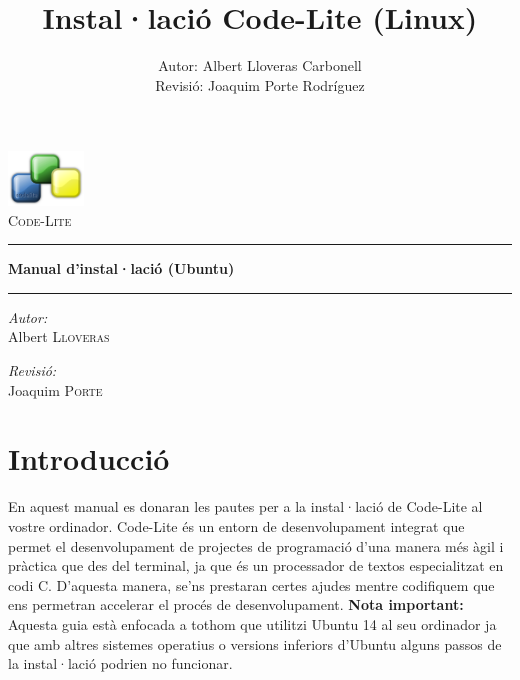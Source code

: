 \documentclass[11pt]{article}
\title{Instal·lació Code-Lite (Linux)}
\author{Autor: Albert Lloveras Carbonell\\Revisió: Joaquim Porte Rodríguez}
\date{}
\begin{document}
\pagestyle{empty}
\begin{center}

	\includegraphics[width=0.15\textwidth]{img/code-lite.png}~\\[1cm]
	
	\textsc{\LARGE Code-Lite}\\[1.5cm]
	
	\hrule
	\vspace{8pt}
	\huge{\bfseries Manual d'instal·lació (Ubuntu)}
	\vspace{8pt}
	\hrule	
	\vspace{12pt	}

	\noindent
	\begin{minipage}{0.4\textwidth}
		\begin{flushleft} \large
			\emph{Autor:}\\
			Albert \textsc{Lloveras}
		\end{flushleft}
	\end{minipage}%
	\begin{minipage}{0.4\textwidth}
		\begin{flushright} \large
			\emph{Revisió:} \\
			Joaquim \textsc{Porte}
		\end{flushright}
	\end{minipage}
	\vfill

\end{center}

\newpage

\pagestyle{empty}
\tableofcontents


\newpage
\pagestyle{pageStyle}


\section{Introducció}
En aquest manual es donaran les pautes per a la instal·lació de Code-Lite al vostre ordinador. Code-Lite és un entorn de desenvolupament integrat que permet el desenvolupament de projectes de programació d'una manera més àgil i pràctica que des del terminal, ja que és un processador de textos especialitzat en codi C. D'aquesta manera, se'ns prestaran certes ajudes mentre codifiquem que ens permetran accelerar el procés de desenvolupament. \linebreak \linebreak
\textbf{Nota important:} Aquesta guia està enfocada a tothom que utilitzi Ubuntu 14 al seu ordinador ja que amb altres sistemes operatius o versions inferiors d'Ubuntu alguns passos de la instal·lació podrien no funcionar.
\end{document}
